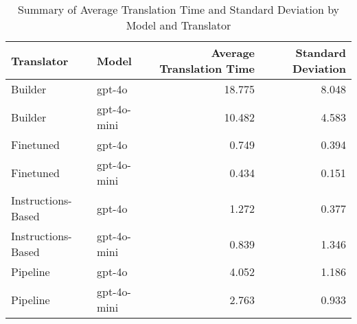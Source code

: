 \begin{table}
\caption{Summary of Average Translation Time and Standard Deviation by Model and Translator}
\label{tab:average_translation_time_summary}
\begin{tabular}{llrr}
\toprule
Translator & Model & Average Translation Time & Standard Deviation \\
\midrule
Builder & gpt-4o & 18.775 & 8.048 \\
Builder & gpt-4o-mini & 10.482 & 4.583 \\
Finetuned & gpt-4o & 0.749 & 0.394 \\
Finetuned & gpt-4o-mini & 0.434 & 0.151 \\
Instructions-Based & gpt-4o & 1.272 & 0.377 \\
Instructions-Based & gpt-4o-mini & 0.839 & 1.346 \\
Pipeline & gpt-4o & 4.052 & 1.186 \\
Pipeline & gpt-4o-mini & 2.763 & 0.933 \\
\bottomrule
\end{tabular}
\end{table}
